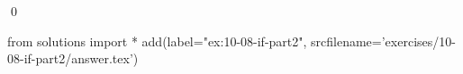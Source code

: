 
\begin{ex}
  \label{ex:10-08-if-part2}
  
  \qed
\end{ex}
\begin{python0}
from solutions import *
add(label="ex:10-08-if-part2",
    srcfilename='exercises/10-08-if-part2/answer.tex')
\end{python0}
